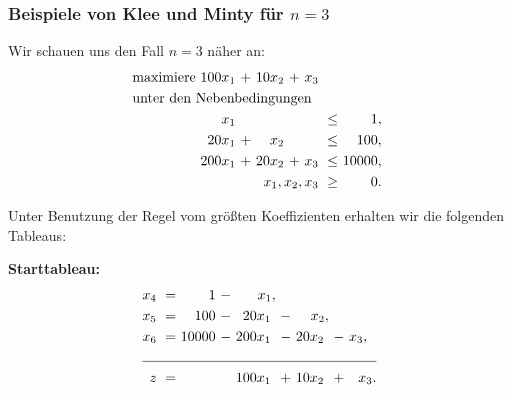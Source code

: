 \documentclass[smaller]{beamer}
\begin{document}
\begin{frame}
 \frametitle{Beispiele von Klee und Minty für $n=3$}
 Wir schauen uns den Fall $n=3$ näher an:
\begin{align*}
\begin{alignedat}{5}
& \text{maximiere } & 100x_1 &\ + &\ 10x_2 &\ + &\ x_3 & & \\
& \rlap{unter den Nebenbedingungen} & & & & & & & \\
&&    x_1 &\   &\       &\   &\     &\ \leq &\     1,\ \\
&&  20x_1 &\ + &\   x_2 &\   &\     &\ \leq &\   100,\ \\
&& 200x_1 &\ + &\ 20x_2 &\ + &\ x_3 &\ \leq &\ 10000,\ \\
&& & & & & \llap{$x_1,x_2,x_3$}     &\ \geq &\     0.\
\end{alignedat}
\end{align*}

Unter Benutzung der Regel vom größten Koeffizienten erhalten wir die folgenden Tableaus: \\ \vspace*{0.2cm}

\textbf{Starttableau:}
\begin{align*}
\begin{alignedat}{5}
x_4 &\ = &\     1 &\ - &\    x_1, &\   &\       &\   &\      \\
x_5 &\ = &\   100 &\ - &\  20x_1\ &\ - &\   x_2, &\   &\      \\
x_6 &\ = &\ 10000 &\ - &\ 200x_1\ &\ - &\ 20x_2\ &\ - &\ x_3,\ \ \\ \cline{1-9}
  z &\ = &\       &\   &\ 100x_1\ &\ + &\ 10x_2\ &\ + &\ x_3. 
\end{alignedat}
\end{align*}
\end{frame}
\end{document}
